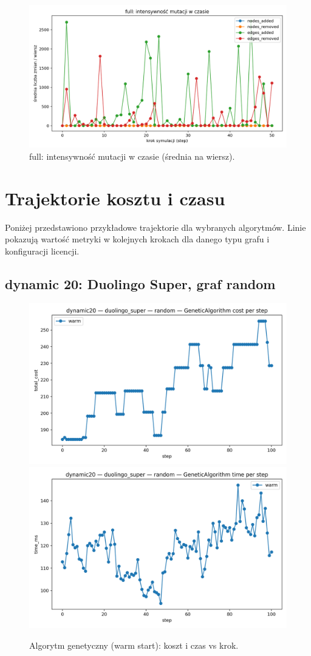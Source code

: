 \begin{figure}[H]
  \centering
  \includegraphics[width=0.75\linewidth]{assets/figures/dynamic/full_mutation_intensity.png}
\caption{full: intensywność mutacji w czasie (średnia na wiersz).}
  \label{fig:full_mut}
\end{figure}

\section{Trajektorie kosztu i czasu}

Poniżej przedstawiono przykładowe trajektorie dla wybranych algorytmów. Linie pokazują wartość metryki w kolejnych krokach dla danego typu grafu i konfiguracji licencji.

\subsection{dynamic 20: Duolingo Super, graf random}

\begin{figure}[H]
  \centering
  \includegraphics[width=0.48\linewidth]{assets/figures/dynamic/dynamic20/duolingo_super/random/GeneticAlgorithm_cost_per_step.png}
  \includegraphics[width=0.48\linewidth]{assets/figures/dynamic/dynamic20/duolingo_super/random/GeneticAlgorithm_time_per_step.png}
\caption{Algorytm genetyczny (warm start): koszt i czas vs krok.}
  \label{fig:dyn20_duo_genetic}
\end{figure}

